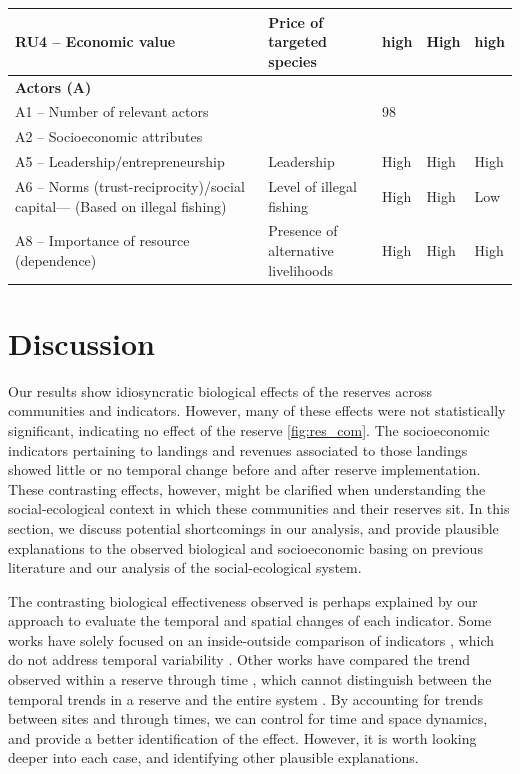 \documentclass{frontiersSCNS}
\theoremstyle{definition}
\theoremstyle{definition}
\theoremstyle{definition}
\theoremstyle{remark}
\begin{document}
\begin{table}
\begin{tabular}[t]{>{\raggedright\arraybackslash}p{10em}|>{\raggedright\arraybackslash}p{10em}|l|l|l}
\hline
RU4 – Economic value & Price of targeted species & high & High & high\\
\hline
\textbf{Actors (A)} & \textbf{} & \textbf{} & \textbf{}\\
\hline
A1 – Number of relevant actors &  & 98 &  & \\
\hline
A2 – Socioeconomic attributes &  &  &  & \\
\hline
A5 – Leadership/entrepreneurship & Leadership & High & High & High\\
\hline
A6 – Norms (trust-reciprocity)/social capital--- (Based on illegal fishing) & Level of illegal fishing & High & High & Low\\
\hline
A8 – Importance of resource (dependence) & Presence of alternative livelihoods & High & High & High\\
\hline
\end{tabular}
\end{table}

\clearpage

\section{Discussion}\label{discussion}

Our results show idiosyncratic biological effects of the reserves across
communities and indicators. However, many of these effects were not
statistically significant, indicating no effect of the reserve
\ref{fig:res_com}. The socioeconomic indicators pertaining to landings
and revenues associated to those landings showed little or no temporal
change before and after reserve implementation. These contrasting
effects, however, might be clarified when understanding the
social-ecological context in which these communities and their reserves
sit. In this section, we discuss potential shortcomings in our analysis,
and provide plausible explanations to the observed biological and
socioeconomic basing on previous literature and our analysis of the
social-ecological system.

The contrasting biological effectiveness observed is perhaps explained
by our approach to evaluate the temporal and spatial changes of each
indicator. Some works have solely focused on an inside-outside
comparison of indicators
\citep{guidetti_2014-8Z,friedlander_2017-oI,rodriguez_2017-PD}, which do
not address temporal variability \citep{depalma_2018}. Other works have
compared the trend observed within a reserve through time
\citep{betti_2017-lq}, which cannot distinguish between the temporal
trends in a reserve and the entire system \citep{depalma_2018}. By
accounting for trends between sites and through times, we can control
for time and space dynamics, and provide a better identification of the
effect. However, it is worth looking deeper into each case, and
identifying other plausible explanations.
\end{document}
